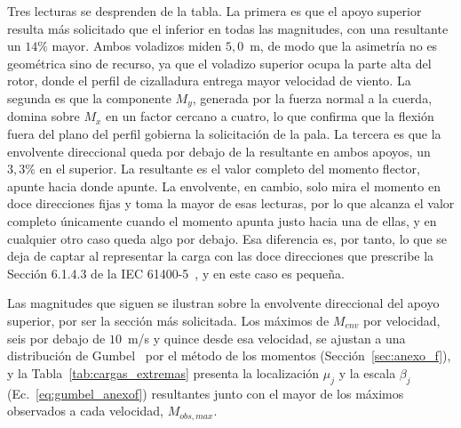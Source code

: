 Tres lecturas se desprenden de la tabla. La primera es que el apoyo superior resulta más solicitado que el inferior en todas las magnitudes, con una resultante un $14\%$ mayor. Ambos voladizos miden $5{,}0$~m, de modo que la asimetría no es geométrica sino de recurso, ya que el voladizo superior ocupa la parte alta del rotor, donde el perfil de cizalladura entrega mayor velocidad de viento. La segunda es que la componente $M_y$, generada por la fuerza normal a la cuerda, domina sobre $M_x$ en un factor cercano a cuatro, lo que confirma que la flexión fuera del plano del perfil gobierna la solicitación de la pala. La tercera es que la envolvente direccional queda por debajo de la resultante en ambos apoyos, un $3{,}3\%$ en el superior. La resultante es el valor completo del momento flector, apunte hacia donde apunte. La envolvente, en cambio, solo mira el momento en doce direcciones fijas y toma la mayor de esas lecturas, por lo que alcanza el valor completo únicamente cuando el momento apunta justo hacia una de ellas, y en cualquier otro caso queda algo por debajo. Esa diferencia es, por tanto, lo que se deja de captar al representar la carga con las doce direcciones que prescribe la Sección 6.1.4.3 de la IEC 61400-5~\parencite*{IEC61400-5}, y en este caso es pequeña.

Las magnitudes que siguen se ilustran sobre la envolvente direccional del apoyo superior, por ser la sección más solicitada. Los máximos de $M_{env}$ por velocidad, seis por debajo de $10$~m/s y quince desde esa velocidad, se ajustan a una distribución de Gumbel~\parencite{Gumbel1958} por el método de los momentos (Sección~\ref{sec:anexo_f}), y la Tabla~\ref{tab:cargas_extremas} presenta la localización $\mu_j$ y la escala $\beta_j$ (Ec.~\ref{eq:gumbel_anexof}) resultantes junto con el mayor de los máximos observados a cada velocidad, $M_{obs,max}$.


